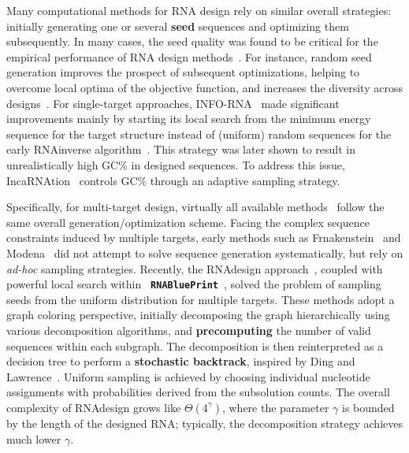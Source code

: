 \documentclass{bioinfo}
\newcommand{\Def}[1]{{\bfseries #1}}
\newcommand{\parHead}[1]{\Final{\paragraph{#1}}}
\newcommand{\Final}[1]{\begingroup\color{red!70!black}#1\endgroup}
\renewcommand{\Final}[1]{}
\newcommand{\Nuc}[1]{{\sf #1}}
\newcommand{\Cb}{\Nuc{C}}
\newcommand{\Gb}{\Nuc{G}}
\newcommand{\GCb}{\Gb\Cb}
\newcommand{\Software}[1]{{\ttfamily #1}}
\newcommand{\RNAblueprint}{{\tt \bfseries{}\color{black!85} RNA\textcolor{blue!70!black}{Blue}Print}}
\begin{document}
\parHead{On the importance of sampling for design.}
Many computational methods for RNA design rely on similar overall
strategies: initially generating one or several \Def{seed} sequences
and optimizing them subsequently. In many cases, the seed quality was
found to be critical for the empirical performance of RNA design
methods~\citep{Levin2012}. For instance, random seed generation
improves the prospect of subsequent optimizations, helping to overcome
local optima of the objective function, and increases the diversity
across designs~\citep{Reinharz2013}.  For single-target approaches,
\Software{INFO-RNA}~\citep{Busch2006} made significant improvements
mainly by starting its local search from the minimum energy sequence
for the target structure instead of (uniform) random sequences for the
early \Software{RNAinverse} algorithm~\citep{Hofacker1994}. This
strategy was later shown to result in unrealistically high
\GCb\% in designed sequences. To address this issue,
\Software{IncaRNAtion}~\citep{Reinharz2013} controls \GCb\%
through an adaptive sampling strategy.

\parHead{Specificities and similarities of multi-target design.}
Specifically, for multi-target design, virtually all available methods~\citep{Lyngsoe2012,HoenerzuSiederdissen2013,Taneda2015,Hammer2017} follow the same overall generation/optimization scheme.
%
Facing the complex sequence constraints induced by multiple targets, early methods such as \Software{Frnakenstein}~\citep{Lyngsoe2012} and \Software{Modena}~\citep{Taneda2015} did not attempt to solve sequence generation systematically, but rely on \emph{ad-hoc} sampling strategies.
%
Recently, the \Software{RNAdesign}
approach~\citep{HoenerzuSiederdissen2013}, coupled with powerful local
search within \RNAblueprint{}~\citep{Hammer2017}, solved the
problem of sampling seeds from the uniform distribution for multiple
targets. These methods adopt a graph coloring perspective, initially
decomposing the graph hierarchically using various decomposition
algorithms, and \Def{precomputing} the number of valid sequences
within each subgraph. The decomposition is then reinterpreted as a
decision tree to perform a \Def{stochastic backtrack}, inspired by
Ding and Lawrence~\citep{Ding2003}. Uniform sampling is achieved by
choosing individual nucleotide assignments with probabilities derived
from the subsolution counts. The overall complexity of
\Software{RNAdesign} grows like $\Theta(4^{\gamma})$, where the
parameter $\gamma$ is bounded by the length of the designed RNA;
typically, the decomposition strategy achieves much lower $\gamma$.
\end{document}
